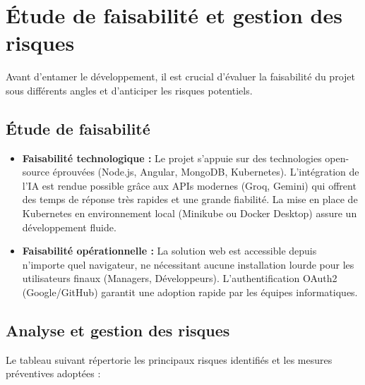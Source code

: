 \section{Étude de faisabilité et gestion des risques}
\label{sec:faisabilite}

Avant d'entamer le développement, il est crucial d'évaluer la faisabilité du projet sous différents angles et 
d'anticiper les risques potentiels.

\subsection{Étude de faisabilité}

\begin{itemize}
  \item \textbf{Faisabilité technologique :} Le projet s'appuie sur des technologies open-source éprouvées (Node.js, Angular, MongoDB, Kubernetes). 
  L'intégration de l'IA est rendue possible grâce aux APIs modernes (Groq, Gemini) qui offrent des temps de réponse très rapides et une grande fiabilité. La mise en place de Kubernetes en environnement local (Minikube ou Docker Desktop) assure un développement fluide.
  
  \item \textbf{Faisabilité opérationnelle :} La solution web est accessible depuis n'importe quel navigateur, ne nécessitant aucune installation lourde pour les utilisateurs finaux (Managers, Développeurs). L'authentification OAuth2 (Google/GitHub) garantit une adoption rapide par les équipes informatiques.
\end{itemize}

\subsection{Analyse et gestion des risques}

Le tableau suivant répertorie les principaux risques identifiés et les mesures préventives adoptées :

